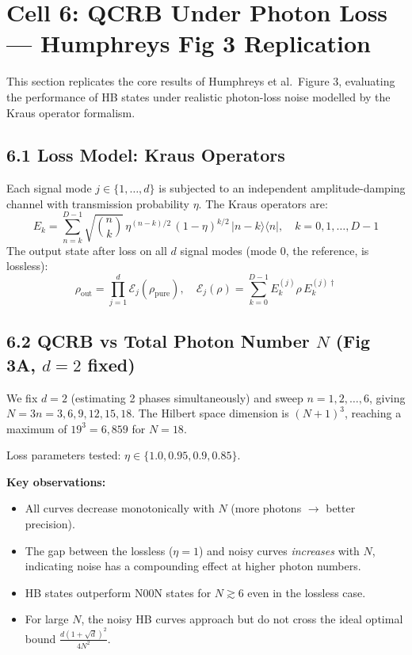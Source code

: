\documentclass[12pt]{article}
\begin{document}
\section*{Cell 6: QCRB Under Photon Loss — Humphreys Fig 3 Replication}

This section replicates the core results of Humphreys et al.\ Figure 3, evaluating the performance of HB states under realistic photon-loss noise modelled by the Kraus operator formalism.

\subsection*{6.1 Loss Model: Kraus Operators}
Each signal mode $j \in \{1, \ldots, d\}$ is subjected to an independent amplitude-damping channel with transmission probability $\eta$. The Kraus operators are:
\begin{equation}
    E_k = \sum_{n=k}^{D-1} \sqrt{\binom{n}{k}} \, \eta^{(n-k)/2} \, (1-\eta)^{k/2} \, |n-k\rangle\langle n|, \quad k = 0, 1, \ldots, D-1
\end{equation}
The output state after loss on all $d$ signal modes (mode 0, the reference, is lossless):
\begin{equation}
    \rho_{\text{out}} = \prod_{j=1}^{d} \mathcal{E}_j(\rho_{\text{pure}}), \quad \mathcal{E}_j(\rho) = \sum_{k=0}^{D-1} E_k^{(j)} \rho \, E_k^{(j)\dagger}
\end{equation}

\subsection*{6.2 QCRB vs Total Photon Number $N$ (Fig 3A, $d=2$ fixed)}
We fix $d=2$ (estimating 2 phases simultaneously) and sweep $n = 1, 2, \ldots, 6$, giving $N = 3n = 3, 6, 9, 12, 15, 18$. The Hilbert space dimension is $(N+1)^3$, reaching a maximum of $19^3 = 6{,}859$ for $N=18$.

Loss parameters tested: $\eta \in \{1.0, 0.95, 0.9, 0.85\}$.

\textbf{Key observations:}
\begin{itemize}
    \item All curves decrease monotonically with $N$ (more photons $\rightarrow$ better precision).
    \item The gap between the lossless ($\eta = 1$) and noisy curves \emph{increases} with $N$, indicating noise has a compounding effect at higher photon numbers.
    \item HB states outperform N00N states for $N \gtrsim 6$ even in the lossless case.
    \item For large $N$, the noisy HB curves approach but do not cross the ideal optimal bound $\frac{d(1+\sqrt{d})^2}{4N^2}$.
\end{itemize}
\end{document}
